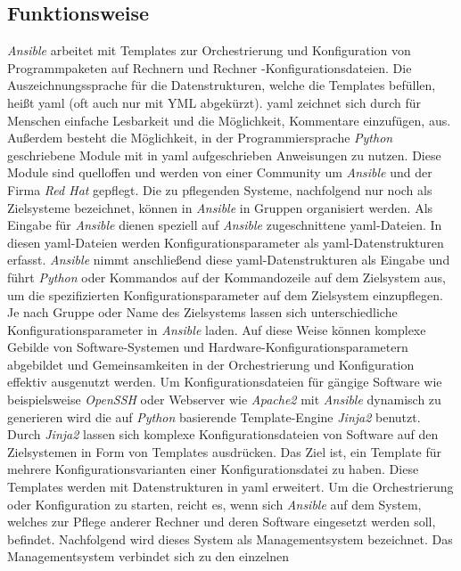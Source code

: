 \documentclass[titlepage]{report}
\begin{document}
\subsection{Funktionsweise}
\emph{Ansible} arbeitet mit Templates zur Orchestrierung und
Konfiguration von Programmpaketen auf Rechnern und Rechner
\hyp{}Konfigurationsdateien. Die Auszeichnungssprache für die
Datenstrukturen, welche die Templates befüllen, heißt \gls{yaml} (oft
auch nur mit YML abgekürzt). \gls{yaml} zeichnet sich durch für Menschen
einfache Lesbarkeit und die Möglichkeit, Kommentare einzufügen,
aus\cite{YAML_WIKI}. Außerdem besteht die Möglichkeit, in der
Programmiersprache \emph{Python} geschriebene Module mit in \gls{yaml}
aufgeschrieben Anweisungen zu nutzen. Diese Module sind quelloffen und
werden von einer Community um \emph{Ansible} und der Firma \emph{Red
Hat} gepflegt. Die zu pflegenden Systeme, nachfolgend nur noch als
Zielsysteme bezeichnet, können in \emph{Ansible} in Gruppen 
organisiert werden.
Als Eingabe für \emph{Ansible} dienen speziell auf \emph{Ansible}
zugeschnittene \gls{yaml}\hyp{}Dateien. In diesen
\gls{yaml}\hyp{}Dateien werden Konfigurationsparameter als
\gls{yaml}\hyp{}Datenstrukturen erfasst. \emph{Ansible} nimmt
anschließend diese \gls{yaml}\hyp{}Datenstrukturen als Eingabe und führt
\emph{Python} oder Kommandos auf der Kommandozeile auf dem Zielsystem
aus, um die spezifizierten
Konfigurationsparameter auf dem Zielsystem einzupflegen. Je nach Gruppe oder
Name des Zielsystems lassen sich unterschiedliche
Konfigurationsparameter in \emph{Ansible} laden.
Auf diese Weise können komplexe Gebilde von Software\hyp{}Systemen und
Hardware\hyp{}Konfigurationsparametern abgebildet
und Gemeinsamkeiten in der Orchestrierung und Konfiguration effektiv ausgenutzt werden.
Um Konfigurationsdateien für gängige Software wie beispielsweise
\emph{OpenSSH} oder Webserver wie \emph{Apache2} mit \emph{Ansible}
dynamisch zu generieren wird die auf \emph{Python} basierende Template\hyp{}Engine
\emph{Jinja2} benutzt\cite{JINJA2}. Durch \emph{Jinja2} lassen sich komplexe
Konfigurationsdateien von Software auf den Zielsystemen in Form von Templates
ausdrücken. Das Ziel ist, ein Template für mehrere
Konfigurationsvarianten einer Konfigurationsdatei zu haben. Diese
Templates werden mit Datenstrukturen in \gls{yaml} erweitert.
Um die Orchestrierung oder Konfiguration zu starten, reicht es, wenn sich
\emph{Ansible} auf dem System, welches zur Pflege anderer Rechner und
deren Software eingesetzt werden
soll, befindet. Nachfolgend wird dieses System als Managementsystem
bezeichnet. Das Managementsystem verbindet sich zu den einzelnen
\end{document}
